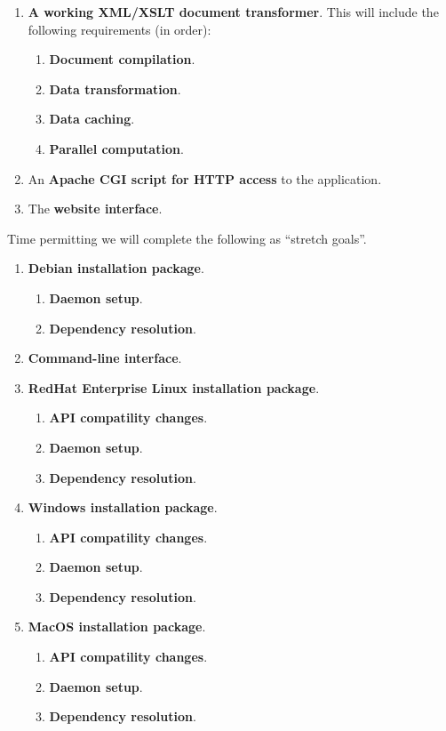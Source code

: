 \begin{enumerate}
  \item {
    \textbf{A working XML/XSLT document transformer}.
    This will include the following requirements (in order):
    \begin{enumerate}
      \item \textbf{Document compilation}.
      \item \textbf{Data transformation}.
      \item \textbf{Data caching}.
      \item \textbf{Parallel computation}.
    \end{enumerate}
  }
  \item An \textbf{Apache CGI script for HTTP access} to the application.
  \item The \textbf{website interface}.
\end{enumerate}

Time permitting we will complete the following as ``stretch goals''.

\begin{enumerate}
  \item {
    \textbf{Debian installation package}.
    \begin{enumerate}
      \item \textbf{Daemon setup}.
      \item \textbf{Dependency resolution}.
    \end{enumerate}
  }
  \item \textbf{Command-line interface}.
  \item {
    \textbf{RedHat Enterprise Linux installation package}.
    \begin{enumerate}
      \item \textbf{API compatility changes}.
      \item \textbf{Daemon setup}.
      \item \textbf{Dependency resolution}.
    \end{enumerate}
  }
  \item {
    \textbf{Windows installation package}.
    \begin{enumerate}
      \item \textbf{API compatility changes}.
      \item \textbf{Daemon setup}.
      \item \textbf{Dependency resolution}.
    \end{enumerate}
  }
  \item {
    \textbf{MacOS installation package}.
    \begin{enumerate}
      \item \textbf{API compatility changes}.
      \item \textbf{Daemon setup}.
      \item \textbf{Dependency resolution}.
    \end{enumerate}
  }
\end{enumerate}
